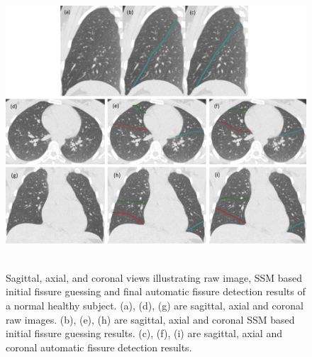 \documentclass[]{spie}  %
\begin{document}
{  %

\begin{figure}[htbp]
  \centering 
  \includegraphics[height=4.2in]{Image/SegmentationResult.png}
  \caption{Sagittal, axial, and coronal views illustrating raw image, SSM based initial fissure guessing and final automatic fissure detection results of a normal healthy subject. (a), (d), (g) are sagittal, axial and coronal raw images. (b), (e), (h) are sagittal, axial and coronal SSM based initial fissure guessing results. (c), (f), (i) are sagittal, axial and coronal automatic fissure detection results.}
  \label{fig:HLASegmentationResults}
\end{figure}

}
\end{document}
